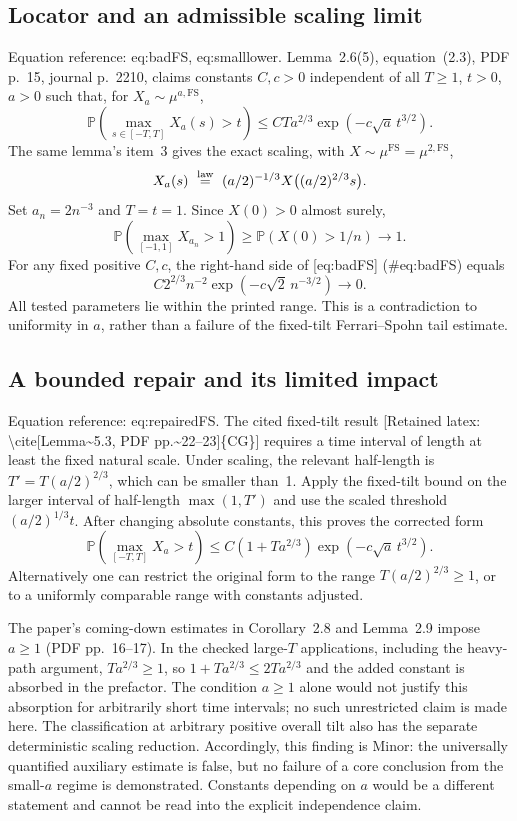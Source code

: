 \documentclass[10pt]{article}
\begin{document}
\subsection*{Locator and an admissible scaling limit}
Equation reference: eq:badFS, eq:smalllower. Lemma 2.6(5), equation (2.3), PDF p. 15, journal p. 2210, claims constants \(C,c>0\) independent of all \(T\geq1\), \(t>0\), \(a>0\) such that, for \(X_a\sim\mu^{a,\mathrm{FS}}\), \[
 \mathbb P\!\left(\max_{s\in[-T,T]}X_a(s)>t\right)
 \leq CTa^{2/3}\exp(-c\sqrt a\,t^{3/2}).\] The same lemma’s item 3 gives the exact scaling, with \(X\sim\mu^\mathrm{FS}=\mu^{2,\mathrm{FS}}\), \[X_a(s)\ \stackrel{\rm law}{=}\
 (a/2)^{-1/3}X\big((a/2)^{2/3}s\big).\] Set \(a_n=2n^{-3}\) and \(T=t=1\). Since \(X(0)>0\) almost surely, \[
 \mathbb P\!\left(\max_{[-1,1]}X_{a_n}>1\right)
 \geq \mathbb P(X(0)>1/n)\longrightarrow1.\] For any fixed positive \(C,c\), the right-hand side of [eq:badFS] (\#eq:badFS) equals \[C2^{2/3}n^{-2}\exp(-c\sqrt2\,n^{-3/2})\longrightarrow0.\] All tested parameters lie within the printed range. This is a contradiction to uniformity in \(a\), rather than a failure of the fixed-tilt Ferrari–Spohn tail estimate.\par
\subsection*{A bounded repair and its limited impact}
Equation reference: eq:repairedFS. The cited fixed-tilt result [Retained latex: \textbackslash{}cite[Lemma\textasciitilde{}5.3, PDF pp.\textasciitilde{}22--23]\{CG\}] requires a time interval of length at least the fixed natural scale. Under scaling, the relevant half-length is \(T'=T(a/2)^{2/3}\), which can be smaller than 1. Apply the fixed-tilt bound on the larger interval of half-length \(\max(1,T')\) and use the scaled threshold \((a/2)^{1/3}t\). After changing absolute constants, this proves the corrected form \[
 \mathbb P\!\left(\max_{[-T,T]}X_a>t\right)
 \leq C(1+Ta^{2/3})\exp(-c\sqrt a\,t^{3/2}).\] Alternatively one can restrict the original form to the range \(T(a/2)^{2/3}\geq1\), or to a uniformly comparable range with constants adjusted.\par
The paper’s coming-down estimates in Corollary 2.8 and Lemma 2.9 impose \(a\geq1\) (PDF pp. 16–17). In the checked large-\(T\) applications, including the heavy-path argument, \(Ta^{2/3}\geq1\), so \(1+Ta^{2/3}\leq2Ta^{2/3}\) and the added constant is absorbed in the prefactor. The condition \(a\geq1\) alone would not justify this absorption for arbitrarily short time intervals; no such unrestricted claim is made here. The classification at arbitrary positive overall tilt also has the separate deterministic scaling reduction. Accordingly, this finding is Minor: the universally quantified auxiliary estimate is false, but no failure of a core conclusion from the small-\(a\) regime is demonstrated. Constants depending on \(a\) would be a different statement and cannot be read into the explicit independence claim.\par
\end{document}

